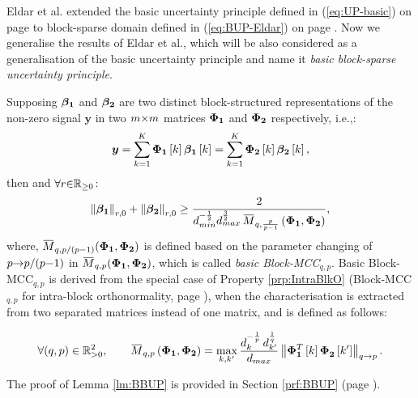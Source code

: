 Eldar et al. extended the basic uncertainty principle defined in (\ref{eq:UP-basic}) on page \pageref{eq:UP-basic} to block-sparse domain defined in (\ref{eq:BUP-Eldar}) on page \pageref{eq:BUP-Eldar} \cite{Eldar2009b,Eldar2010b,Eldar2010}.
Now we generalise the results of Eldar et al., which will be also considered as a generalisation of the basic uncertainty principle \cite{Donoho1989,Donoho2001,Elad2001,Elad2002a} and name it \emph{basic block-sparse uncertainty principle}.
\begin{lemma}
\label{lm:BBUP} 
Supposing $\boldsymbol{\beta_1}$ and $\boldsymbol{\beta_2}$ are two distinct block-structured representations of the non-zero signal $\boldsymbol{y}$ in two  $m {\times} m$ matrices $\boldsymbol{\Phi}_{\boldsymbol{1}}$ and $\boldsymbol{\Phi}_{\boldsymbol{2}}$  respectively, i.e.,:
\begin{equation*}
\boldsymbol{y} = 
\displaystyle\sum_{k=1}^K \boldsymbol{\Phi}_{\boldsymbol{1}} \left[ k \right] \boldsymbol{\beta_1} \left[ k \right] =
\displaystyle\sum_{k=1}^K \boldsymbol{\Phi}_{\boldsymbol{2}} \left[ k \right] \boldsymbol{\beta_2} \left[ k \right],
\end{equation*}
then  and $\forall r {\in} \mathbb{R}_{{\geq} 0}$:
\begin{gather*}
\mynorm{\mybetao}_{r,0} + \mynorm{\mybetaTwo}_{r,0} 
\geq\frac{2}{\mycolor{d_{min}^{-\frac12} d_{max}^{\frac32}} \, \overbar{M}_{q,\frac{p}{p-1}} \myparanthese{\myPhiOne , \myPhiTwo}},
\end{gather*}
where, $\overbar{M}_{q,p/(p \sm 1)} (\myPhiOne , \myPhiTwo)$ is defined based on the parameter changing of $p {\to} p/(p {-} 1)$ in $\overbar{M}_{q,p} (\myPhiOne , \myPhiTwo)$, which is called \emph{basic Block-MCC$_{q,p}$}.
Basic Block-MCC$_{q,p}$ is derived from the special case of Property \ref{prp:IntraBlkO} (Block-MCC$_{q,p}$ for intra-block orthonormality, page \pageref{prp:IntraBlkO}), when the characterisation is extracted from two separated matrices instead of one matrix, and is defined as follows:
\iffalse
\begin{equation*}
\overbar{M}_{q,\frac{p}{p-1}}\myparanthese{\myPhiOne , \myPhiTwo} = 
\max_{k,k'} \frac{d_{k}^{-\frac{p-1}{p}} \, d_{k'}^{\frac1q}}{d_{max}}\mynorm{\myPhiOne^T \mybracket{k} \myPhiTwo^{ } \mybracket{k'}}_{q \to \frac{p}{p-1}}.
\end{equation*}
\fi
\begin{equation*}
\mycolor{\forall (q , p) \in \mathbb{R}^2_{>0}, \qquad
\overbar{M}_{q,p}\myparanthese{\myPhiOne , \myPhiTwo} = 
\max_{k,k'} \frac{d_{k}^{-\frac{1}{p}} \, d_{k'}^{\frac1q}}{d_{max}}\mynorm{\myPhiOne^T \mybracket{k} \myPhiTwo^{ } \mybracket{k'}}_{q \to p}.}
\end{equation*}
\end{lemma}
The proof of Lemma \ref{lm:BBUP} is provided in Section \ref{prf:BBUP} (page \pageref{prf:BBUP}).


